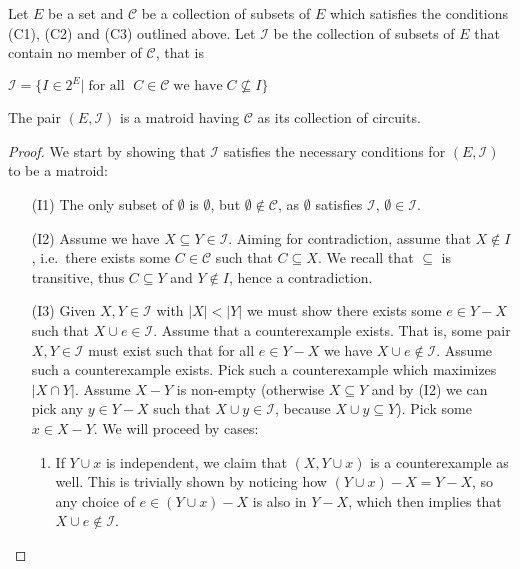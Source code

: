 \begin{theorem}\label{thm:matroid-circuit-definition}
Let $E$ be a set and $\mathcal C$ be a collection of subsets of $E$ which satisfies the conditions (C1), (C2) and (C3) outlined above. Let  $\mathcal I$  be the collection of subsets of $E$ that contain no member of $\mathcal C$, that is

\begin{center}
    $ \mathcal{I} = \{I \in 2^E |\; \text{for all } \; C \in \mathcal{C}\; \text{we have} \; C \not\subseteq I\}$
\end{center}
    The pair $(E,\mathcal I)$ is a matroid having $\mathcal C$ as its collection of circuits.
\end{theorem}

\begin{proof} We start by showing that $\mathcal I $ satisfies the necessary conditions for $(E, \mathcal I )$ to be a matroid:
    \begin{enumerate} 
        \item[(I1)] The only subset of $\emptyset $ is $ \emptyset $, but $ \emptyset \not\in \mathcal C $, as $ \emptyset $ satisfies $\mathcal{I}$, $\emptyset \in \mathcal I$.
        \item[(I2)] Assume we have $X \subseteq Y \in \mathcal I$. Aiming for contradiction, assume that $X \not\in I$, i.e.\ there exists some $C \in \mathcal C $ such that $C \subseteq X$. We recall that $\subseteq $ is transitive, thus $C \subseteq Y$ and $Y \not\in I$, hence a contradiction.
        \item[(I3)] Given $X, Y \in \mathcal I $ with $|X| < |Y|$ we must show there exists some $e \in Y - X$ such that $X \cup e \in \mathcal I$. Assume that a counterexample exists. That is, some pair $X, Y \in \mathcal I$ must exist such that for all $e \in Y - X$ we have $X \cup e \not\in \mathcal I$. Assume such a counterexample exists. Pick such a counterexample which maximizes $|X \cap Y|$. Assume $X - Y$ is non-empty (otherwise $X \subseteq Y$ and by (I2) we can pick any $ y\in Y - X$ such that $X \cup y \in \mathcal I$, because $X\cup y\subseteq Y$). Pick some $x \in X - Y$. We will proceed by cases:
          \begin{enumerate}
            \item If $Y \cup x$ is independent, we claim that $(X, Y \cup x)$ is a counterexample as well. This is trivially shown by noticing how $(Y \cup x) - X = Y - X$, so any choice of $e \in (Y \cup x) - X$ is also in $Y-X$, which then implies that $X\cup e\notin \mathcal{I}$.

\end{enumerate}
\end{enumerate}
\end{proof}

